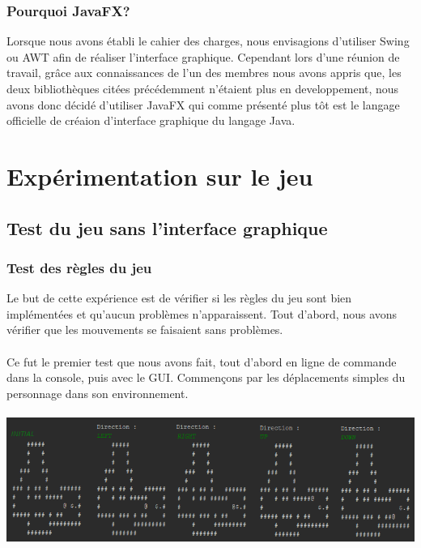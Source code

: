 \documentclass[a4paper,12pt]{article} %
\begin{document}
		\subsubsection{Pourquoi JavaFX?}
		Lorsque nous avons établi le cahier des charges, nous envisagions d'utiliser Swing ou AWT afin de réaliser l'interface graphique. Cependant lors d'une réunion de travail, grâce aux connaissances de l'un des membres nous avons appris que, les deux bibliothèques citées précédemment n'étaient plus en developpement, nous avons donc décidé d'utiliser JavaFX qui comme présenté plus tôt est le langage officielle de créaion d'interface graphique du langage Java.
	
\newpage


\section{Expérimentation sur le jeu}
	\subsection{Test du jeu sans l'interface graphique}
	
	\subsubsection{Test des règles du jeu}
	Le but de cette expérience est de vérifier si les règles du jeu sont bien implémentées et qu'aucun problèmes n'apparaissent. Tout d'abord, nous avons vérifier que les mouvements se faisaient sans problèmes.
	\paragraph{}
	
	Ce fut le premier test que nous avons fait, tout d'abord en ligne de commande dans la console, puis avec le GUI. Commençons par les déplacements simples du personnage dans son environnement.
	\paragraph{}
	\begin{center}
	\includegraphics[scale=0.65]{Tests-mouvements-console.png}
	\end{center}
		
\end{document}
